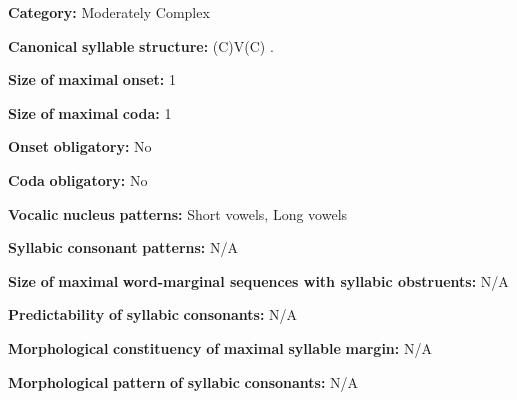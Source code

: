 \documentclass[output=paper]{langsci/langscibook}
\begin{document}
\begin{styleBody}
\textbf{Category:} Moderately Complex
\end{styleBody}

\begin{styleBody}
\textbf{Canonical} \textbf{syllable} \textbf{structure:} (C)V(C) \citep[18-21]{Broadwell2006}.
\end{styleBody}

\begin{styleBody}
\textbf{Size} \textbf{of} \textbf{maximal} \textbf{onset:} 1
\end{styleBody}

\begin{styleBody}
\textbf{Size} \textbf{of} \textbf{maximal} \textbf{coda:} 1
\end{styleBody}

\begin{styleBody}
\textbf{Onset} \textbf{obligatory:} No
\end{styleBody}

\begin{styleBody}
\textbf{Coda} \textbf{obligatory:} No
\end{styleBody}

\begin{styleBody}
\textbf{Vocalic} \textbf{nucleus} \textbf{patterns:} Short vowels, Long vowels
\end{styleBody}

\begin{styleBody}
\textbf{Syllabic} \textbf{consonant} \textbf{patterns:} N/A
\end{styleBody}

\begin{styleBody}
\textbf{Size} \textbf{of} \textbf{maximal} \textbf{word{}-marginal sequences with syllabic obstruents:} N/A
\end{styleBody}

\begin{styleBody}
\textbf{Predictability} \textbf{of} \textbf{syllabic} \textbf{consonants:} N/A
\end{styleBody}

\begin{styleBody}
\textbf{Morphological} \textbf{constituency} \textbf{of} \textbf{maximal} \textbf{syllable} \textbf{margin:} N/A
\end{styleBody}

\begin{styleBody}
\textbf{Morphological} \textbf{pattern} \textbf{of} \textbf{syllabic} \textbf{consonants:} N/A
\end{styleBody}
\end{document}
